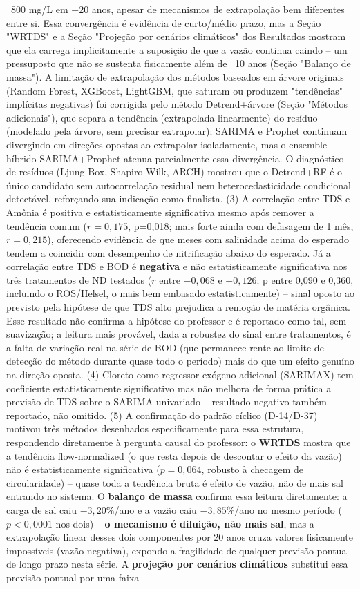 ~800 mg/L em +20 anos, apesar de mecanismos de extrapolação bem diferentes entre si. Essa convergência é evidência de curto/médio prazo, mas a Seção "WRTDS" e a Seção "Projeção por cenários climáticos" dos Resultados mostram que ela carrega implicitamente a suposição de que a vazão continua caindo -- um pressuposto que não se sustenta fisicamente além de ~10 anos (Seção "Balanço de massa"). A limitação de extrapolação dos métodos baseados em árvore originais (Random Forest, XGBoost, LightGBM, que saturam ou produzem "tendências" implícitas negativas) foi corrigida pelo método Detrend+árvore (Seção "Métodos adicionais"), que separa a tendência (extrapolada linearmente) do resíduo (modelado pela árvore, sem precisar extrapolar); SARIMA e Prophet continuam divergindo em direções opostas ao extrapolar isoladamente, mas o ensemble híbrido SARIMA+Prophet atenua parcialmente essa divergência. O diagnóstico de resíduos (Ljung-Box, Shapiro-Wilk, ARCH) mostrou que o Detrend+RF é o único candidato sem autocorrelação residual nem heterocedasticidade condicional detectável, reforçando sua indicação como finalista. (3) A correlação entre TDS e Amônia é positiva e estatisticamente significativa mesmo após remover a tendência comum ($r=0{,}175$, p=0,018; mais forte ainda com defasagem de 1 mês, $r=0{,}215$), oferecendo evidência de que meses com salinidade acima do esperado tendem a coincidir com desempenho de nitrificação abaixo do esperado. Já a correlação entre TDS e BOD é \textbf{negativa} e não estatisticamente significativa nos três tratamentos de ND testados ($r$ entre $-0{,}068$ e $-0{,}126$; p entre 0,090 e 0,360, incluindo o ROS/Helsel, o mais bem embasado estatisticamente) -- sinal oposto ao previsto pela hipótese de que TDS alto prejudica a remoção de matéria orgânica. Esse resultado não confirma a hipótese do professor e é reportado como tal, sem suavização; a leitura mais provável, dada a robustez do sinal entre tratamentos, é a falta de variação real na série de BOD (que permanece rente ao limite de detecção do método durante quase todo o período) mais do que um efeito genuíno na direção oposta. (4) Cloreto como regressor exógeno adicional (SARIMAX) tem coeficiente estatisticamente significativo mas não melhora de forma prática a previsão de TDS sobre o SARIMA univariado -- resultado negativo também reportado, não omitido. (5) A confirmação do padrão cíclico (D-14/D-37) motivou três métodos desenhados especificamente para essa estrutura, respondendo diretamente à pergunta causal do professor: o \textbf{WRTDS} mostra que a tendência flow-normalized (o que resta depois de descontar o efeito da vazão) não é estatisticamente significativa ($p=0{,}064$, robusto à checagem de circularidade) -- quase toda a tendência bruta é efeito de vazão, não de mais sal entrando no sistema. O \textbf{balanço de massa} confirma essa leitura diretamente: a carga de sal caiu $-3{,}20\%$/ano e a vazão caiu $-3{,}85\%$/ano no mesmo período ($p<0{,}0001$ nos dois) -- \textbf{o mecanismo é diluição, não mais sal}, mas a extrapolação linear desses dois componentes por 20 anos cruza valores fisicamente impossíveis (vazão negativa), expondo a fragilidade de qualquer previsão pontual de longo prazo nesta série. A \textbf{projeção por cenários climáticos} substitui essa previsão pontual por uma faixa 